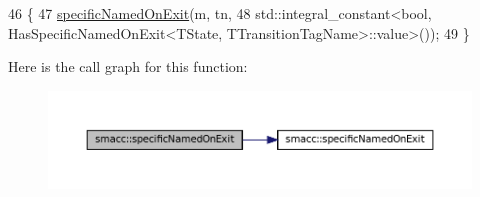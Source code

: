 \begin{DoxyCode}
46 \{
47     \hyperlink{namespacesmacc_ad462e5c9a025fe42bb06de617fabeaa5}{specificNamedOnExit}(m, tn,
48         std::integral\_constant<\textcolor{keywordtype}{bool}, HasSpecificNamedOnExit<TState, TTransitionTagName>::value>());
49 \}
\end{DoxyCode}
Here is the call graph for this function\+:
\nopagebreak
\begin{figure}[H]
\begin{center}
\leavevmode
\includegraphics[width=350pt]{namespacesmacc_ad462e5c9a025fe42bb06de617fabeaa5_cgraph}
\end{center}
\end{figure}
